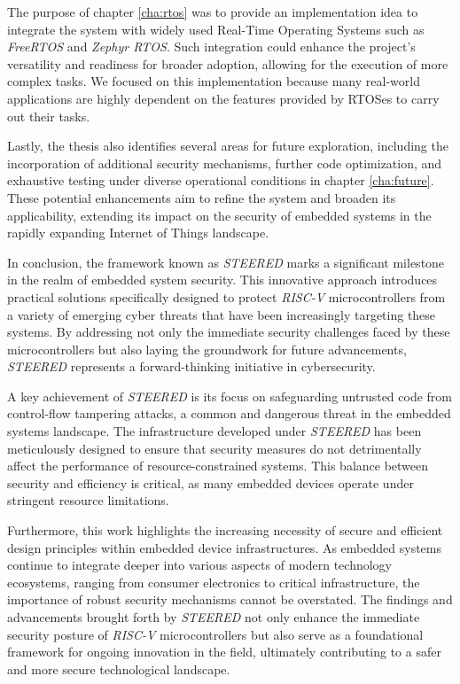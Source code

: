 The purpose of chapter \ref{cha:rtos} was to provide an implementation idea to
integrate the system with widely used Real-Time Operating Systems such as
\textit{FreeRTOS} and \textit{Zephyr RTOS}. Such integration could enhance the project's
versatility and readiness for broader adoption, allowing for the execution of
more complex tasks. We focused on this implementation because many real-world applications
are highly dependent on the features provided by RTOSes to carry out their tasks.

Lastly, the thesis also identifies several areas for future exploration, including
the incorporation of additional security mechanisms, further code optimization, and
exhaustive testing under diverse operational conditions in chapter \ref{cha:future}.
These potential enhancements aim to refine the system and broaden its
applicability, extending its impact on the security of embedded systems in the rapidly
expanding Internet of Things landscape.

In conclusion, the framework known as \textit{STEERED} marks a significant milestone
in the realm of embedded system security. This innovative approach introduces
practical solutions specifically designed to protect \textit{RISC-V} microcontrollers
from a variety of emerging cyber threats that have been increasingly targeting these
systems. By addressing not only the immediate security challenges faced by these
microcontrollers but also laying the groundwork for future advancements, \textit{STEERED}
represents a forward-thinking initiative in cybersecurity.

A key achievement of \textit{STEERED} is its focus on safeguarding untrusted code
from control-flow tampering attacks, a common and dangerous threat in the
embedded systems landscape. The infrastructure developed under \textit{STEERED}
has been meticulously designed to ensure that security measures do not
detrimentally affect the performance of resource-constrained systems. This balance
between security and efficiency is critical, as many embedded devices operate
under stringent resource limitations.

Furthermore, this work highlights the increasing necessity of secure and efficient
design principles within embedded device infrastructures. As embedded systems
continue to integrate deeper into various aspects of modern technology
ecosystems, ranging from consumer electronics to critical infrastructure, the
importance of robust security mechanisms cannot be overstated. The findings and advancements
brought forth by \textit{STEERED} not only enhance the immediate security
posture of \textit{RISC-V} microcontrollers but also serve as a foundational framework
for ongoing innovation in the field, ultimately contributing to a safer and more
secure technological landscape.